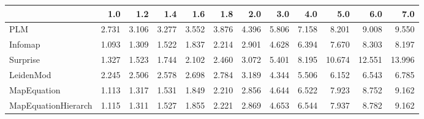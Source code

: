 \begin{tabular}{lrrrrrrrrrrr}
\toprule
{} &   1.0 &   1.2 &   1.4 &   1.6 &   1.8 &   2.0 &   3.0 &   4.0 &    5.0 &    6.0 &    7.0 \\
\midrule
PLM                 & 2.731 & 3.106 & 3.277 & 3.552 & 3.876 & 4.396 & 5.806 & 7.158 &  8.201 &  9.008 &  9.550 \\
Infomap             & 1.093 & 1.309 & 1.522 & 1.837 & 2.214 & 2.901 & 4.628 & 6.394 &  7.670 &  8.303 &  8.197 \\
Surprise            & 1.327 & 1.523 & 1.744 & 2.102 & 2.460 & 3.072 & 5.401 & 8.195 & 10.674 & 12.551 & 13.996 \\
LeidenMod           & 2.245 & 2.506 & 2.578 & 2.698 & 2.784 & 3.189 & 4.344 & 5.506 &  6.152 &  6.543 &  6.785 \\
MapEquation         & 1.113 & 1.317 & 1.531 & 1.849 & 2.210 & 2.856 & 4.644 & 6.522 &  7.923 &  8.752 &  9.162 \\
MapEquationHierarch & 1.115 & 1.311 & 1.527 & 1.855 & 2.221 & 2.869 & 4.653 & 6.544 &  7.937 &  8.782 &  9.162 \\
\bottomrule
\end{tabular}
